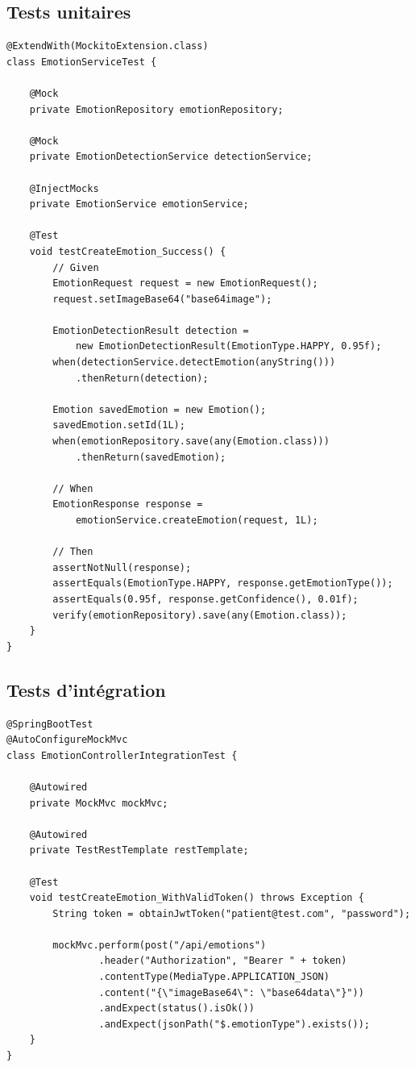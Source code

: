 \documentclass[a4paper,11pt]{report}
\begin{document}
\subsection{Tests unitaires}

\begin{lstlisting}[style=java, caption=Exemple de test unitaire JUnit 5]
@ExtendWith(MockitoExtension.class)
class EmotionServiceTest {
    
    @Mock
    private EmotionRepository emotionRepository;
    
    @Mock
    private EmotionDetectionService detectionService;
    
    @InjectMocks
    private EmotionService emotionService;
    
    @Test
    void testCreateEmotion_Success() {
        // Given
        EmotionRequest request = new EmotionRequest();
        request.setImageBase64("base64image");
        
        EmotionDetectionResult detection = 
            new EmotionDetectionResult(EmotionType.HAPPY, 0.95f);
        when(detectionService.detectEmotion(anyString()))
            .thenReturn(detection);
        
        Emotion savedEmotion = new Emotion();
        savedEmotion.setId(1L);
        when(emotionRepository.save(any(Emotion.class)))
            .thenReturn(savedEmotion);
        
        // When
        EmotionResponse response = 
            emotionService.createEmotion(request, 1L);
        
        // Then
        assertNotNull(response);
        assertEquals(EmotionType.HAPPY, response.getEmotionType());
        assertEquals(0.95f, response.getConfidence(), 0.01f);
        verify(emotionRepository).save(any(Emotion.class));
    }
}
\end{lstlisting}

\subsection{Tests d'intégration}

\begin{lstlisting}[style=java, caption=Exemple de test d'intégration Spring Boot]
@SpringBootTest
@AutoConfigureMockMvc
class EmotionControllerIntegrationTest {
    
    @Autowired
    private MockMvc mockMvc;
    
    @Autowired
    private TestRestTemplate restTemplate;
    
    @Test
    void testCreateEmotion_WithValidToken() throws Exception {
        String token = obtainJwtToken("patient@test.com", "password");
        
        mockMvc.perform(post("/api/emotions")
                .header("Authorization", "Bearer " + token)
                .contentType(MediaType.APPLICATION_JSON)
                .content("{\"imageBase64\": \"base64data\"}"))
                .andExpect(status().isOk())
                .andExpect(jsonPath("$.emotionType").exists());
    }
}
\end{lstlisting}
\end{document}

